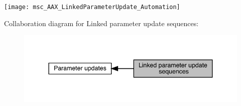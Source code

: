 \begin{DoxyImage}
\texttt{[image: msc\_AAX\_LinkedParameterUpdate\_Automation]}
\end{DoxyImage}
Collaboration diagram for Linked parameter update sequences\+:
\nopagebreak
\begin{figure}[H]
\begin{center}
\leavevmode
\includegraphics[width=344pt]{a00825}
\end{center}
\end{figure}
